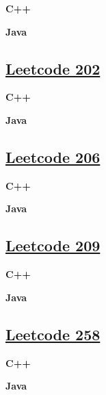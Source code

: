 \textbf{C++}\par


\textbf{Java}\par



\subsection{\href{https://leetcode-cn.com/}{Leetcode 202}}\label{app:codelist:leetcode:202}

\textbf{C++}\par


\textbf{Java}\par



\subsection{\href{https://leetcode-cn.com/}{Leetcode 206}}\label{app:codelist:leetcode:206}

\textbf{C++}\par


\textbf{Java}\par



\subsection{\href{https://leetcode-cn.com/}{Leetcode 209}}\label{app:codelist:leetcode:209}

\textbf{C++}\par


\textbf{Java}\par



\subsection{\href{https://leetcode-cn.com/}{Leetcode 258}}\label{app:codelist:leetcode:258}

\textbf{C++}\par


\textbf{Java}\par



